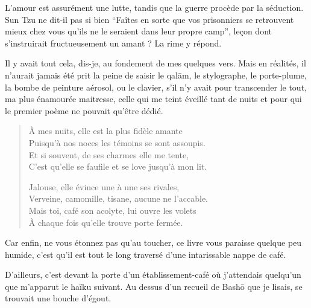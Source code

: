 {  L’amour est assurément une lutte, tandis que la guerre procède par la séduction. Sun Tzu ne dit-il pas si bien \enquote{Faîtes en sorte que vos prisonniers se retrouvent mieux chez vous qu’ils ne le seraient dans leur propre camp}, leçon dont s’instruirait fructueusement un amant ? La rime y répond.

  Il y avait tout cela, dis-je, au fondement de mes quelques vers. Mais en réalités, il n’aurait jamais été prit la peine de saisir le qalām, le stylographe, le porte-plume, la bombe de peinture aérosol, ou le clavier, s’il n’y avait pour transcender le tout, ma plus énamourée maitresse, celle qui me teint éveillé tant de nuits et pour qui le premier poème ne pouvait qu’être dédié.
}

\begin{verse}\quatrain
  À mes nuits, elle est la plus fidèle amante\\ 
  Puisqu’à nos noces les témoins se sont assoupis.\\ 
  Et si souvent, de ses charmes elle me tente,\\ 
  C’est qu’elle se faufile et se love jusqu’à mon lit. 

  Jalouse, elle évince une à une ses rivales,\\ 
  Verveine, camomille, tisane, aucune ne l’accable.\\ 
  Mais toi, café son acolyte, lui ouvre les volets\\ 
  À chaque fois qu’elle trouve porte fermée.  %
\end{verse}

\begin{prose}
  Car enfin, ne vous étonnez pas qu’au toucher, ce livre vous paraisse quelque peu humide, c’est qu’il est tout le long traversé d’une intarissable nappe de café.
\end{prose}

\begin{prose}
  D’ailleurs, c’est devant la porte d’un établissement-café où j’attendais quelqu’un que m’apparut le haïku suivant. Au dessus d’un recueil de Bashō que je lisais, se trouvait une bouche d’égout.
\end{prose}

